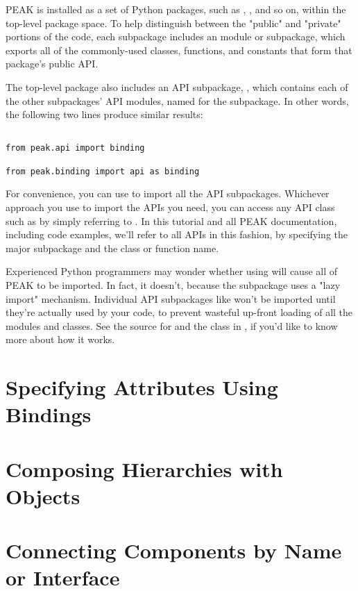 PEAK is installed as a set of Python packages, such as ,
, and so on, within the top-level  package
space.  To help distinguish between the "public" and "private" portions of
the code, each subpackage includes an  module or subpackage, which
exports all of the commonly-used classes, functions, and constants that form
that package's public API.

The top-level package also includes an API subpackage, , which
contains each of the other subpackages' API modules, named for the subpackage.
In other words, the following two lines produce similar results:

\begin{verbatim}

from peak.api import binding

from peak.binding import api as binding

\end{verbatim}

For convenience, you can use  to import all the
API subpackages.  Whichever approach you use to import the APIs you need,
you can access any  API class such as 
by simply referring to .  In this tutorial and all PEAK
documentation, including code examples, we'll refer to all APIs in this
fashion, by specifying the major subpackage and the class or function name.

\begin{notice}
Experienced Python programmers may wonder whether using
 will cause all of PEAK to be imported.  In
fact, it doesn't, because the  subpackage uses a 
"lazy import" mechanism.  Individual API subpackages like 
won't be imported until they're actually used by your code, to prevent wasteful
up-front loading of all the modules and classes.  See the source for
 and the  class in
, if you'd like to know more about how it works.
\end{notice}

\section{Specifying Attributes Using Bindings}



\section{Composing Hierarchies with  Objects}



\section{Connecting Components by Name or Interface}

